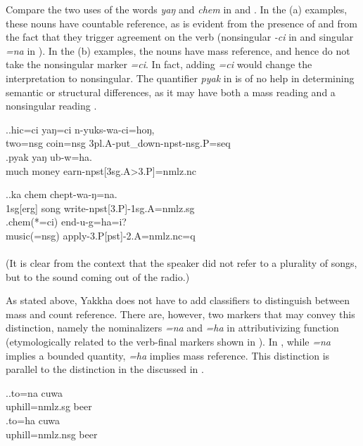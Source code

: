 Compare the two uses of the words \emph{yaŋ}   and \emph{chem}  in \Next and \NNext. In the (a) examples, these nouns have countable reference, as is evident from the presence of  and from the fact that they trigger  agreement on the verb (nonsingular \emph{-ci} in \Next[a] and singular \emph{=na} in \NNext[a]). In the (b) examples, the nouns have mass reference, and hence do not take the nonsingular marker \emph{=ci}.  In fact, adding \emph{=ci} would change the interpretation to nonsingular. The quantifier \emph{pyak} in \Next[b] is of no help in determining semantic or structural differences, as it may have both a mass reading  and a nonsingular reading .

\ex.\ag.hic=ci yaŋ=ci     n-yuks-wa-ci=hoŋ,\\
two{\sc =nsg} coin{\sc =nsg} {\sc 3pl.A-}put\_down{\sc -npst-nsg.P=seq}\\
  
\bg.pyak yaŋ ub-w=ha.\\
much money earn{\sc -npst[3sg.A>3.P]=nmlz.nc}\\


\ex.\ag.ka chem chept-wa-ŋ=na.\\
{\sc 1sg[erg]} song write{\sc -npst[3.P]-1sg.A=nmlz.sg}\\
\bg.chem(*=ci) end-u-g=ha=i?\\
music({\sc *=nsg}) apply{\sc -3.P[pst]-2.A=nmlz.nc=q}\\
 \\
(It is clear from the context that the speaker did not refer to a plurality of songs, but to the sound coming out of the radio.)

As stated above, Yakkha does not have to add classifiers to distinguish between mass and  count reference. There are, however, two markers that may convey this distinction, namely the nominalizers \emph{=na} and \emph{=ha} in attributivizing function (etymologically related to the verb-final markers shown  in \Last). In \Next, while \emph{=na} implies a bounded quantity, \emph{=ha} implies mass reference. This distinction is parallel to the distinction in the  discussed in .

\ex.\ag.to=na cuwa\\
uphill{\sc =nmlz.sg} beer\\
\bg.to=ha cuwa\\
uphill{\sc =nmlz.nsg} beer\\

